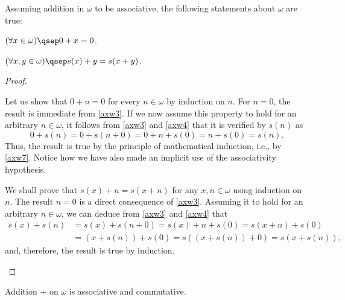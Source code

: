 \begin{lemma}
Assuming addition in $\omega$ to be associative, the following statements about $\omega$ are true:
\begin{statements}
\item \label{xp0i0} $(\forall x \in \omega)\qsep 0 + x = 0$.
\item \label{switchs} $(\forall x,y\in \omega)\qsep s(x) + y = s(x+y)$.
\end{statements}
\label{lemmaomplus}
\end{lemma}

\begin{proof}
\begin{parlist}
\item Let us show that $0 + n = 0$ for every $n\in \omega$ by induction on $n$.
For $n = 0$, the result is immediate from \ref{axw3}.
If we now assume this property to hold for an arbitrary $n\in \omega$, it follows from \ref{axw3} and \ref{axw4} that it is verified by $s(n)$ as
\[ 0 + s(n) = 0 + s(n+0) = 0 + n + s(0) = n + s(0) = s(n).\]
Thus, the result is true by the principle of mathematical induction, i.e., by \ref{axw7}.
Notice how we have also made an implicit use of the associativity hypothesis.

\item We shall prove that $s(x) + n = s(x+n)$ for any $x,n\in \omega$ using induction on $n$.
The result $n = 0$ is a direct consequence of \ref{axw3}. Assuming it to hold for an arbitrary $n\in \omega$, we can deduce from \ref{axw3} and \ref{axw4} that
\begin{align*}
s(x) + s(n) &= s(x) + s(n+0) = s(x) + n + s(0) = s(x+n) + s(0) \\
&= (x+s(n)) + s(0) = s( (x+s(n)) + 0) = s(x+s(n)),
\end{align*}
and, therefore, the result is true by induction.
\end{parlist}
\end{proof}

\begin{proposition}
Addition $+$ on $\omega$ is associative and commutative.
\end{proposition}

